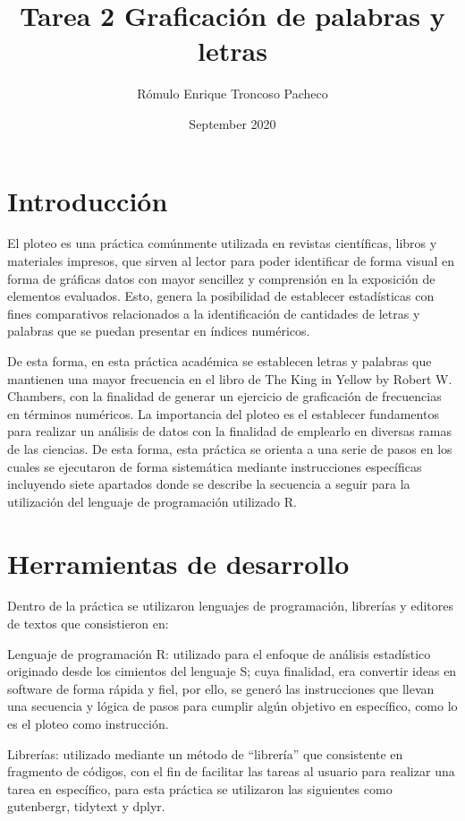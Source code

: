 \documentclass{article}
\title{Tarea 2 Graficación de palabras y letras}
\author{Rómulo Enrique Troncoso Pacheco}
\date{September 2020}
\begin{document}
\maketitle

\section{Introducción}
El ploteo es una práctica comúnmente utilizada en revistas científicas, libros y materiales impresos, que sirven al lector para poder identificar de forma visual en forma de gráficas datos con mayor sencillez y comprensión en la exposición de elementos evaluados. Esto, genera la posibilidad de establecer estadísticas con fines comparativos relacionados a la identificación de cantidades  de letras y palabras que se puedan presentar en índices numéricos.

De esta forma, en esta práctica académica se establecen letras y palabras que mantienen una mayor frecuencia en el libro de The King in Yellow by Robert W. Chambers\cite{The_King_in_Yellow}, con la finalidad de generar un ejercicio de graficación de frecuencias en términos numéricos.
La importancia del ploteo es el establecer fundamentos para realizar un análisis de datos con la finalidad de emplearlo en diversas ramas de las ciencias. De esta forma, esta práctica se orienta a una serie de pasos en los cuales se ejecutaron de forma sistemática mediante instrucciones específicas incluyendo siete apartados donde se describe la secuencia a seguir para la utilización del lenguaje de programación utilizado R\cite{r}.

\section{Herramientas de desarrollo}
Dentro de la práctica se utilizaron lenguajes de programación, librerías y editores de textos que consistieron en:

Lenguaje de programación R\cite{r}: utilizado para el enfoque de análisis estadístico originado desde los cimientos del lenguaje S; cuya finalidad, era convertir ideas en software de forma rápida y fiel, por ello, se generó las instrucciones que llevan una secuencia y lógica de pasos para cumplir algún objetivo en específico, como lo es el ploteo como instrucción.

Librerías: utilizado mediante un método de “librería” que consistente en fragmento de códigos, con el fin de facilitar las tareas al usuario para realizar una tarea en específico, para esta práctica se utilizaron las siguientes como gutenbergr\cite{gutenberg}, tidytext\cite{tidytext} y dplyr\cite{dplyr}.
\end{document}
